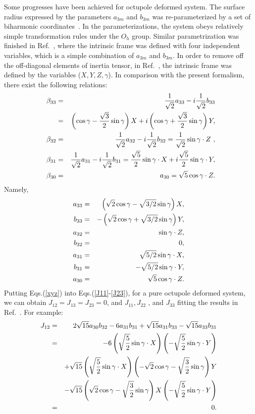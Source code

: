 \documentclass[twocolumn,prc,showpacs,preprintnumbers,superscriptaddress,floatfix]{revtex4}
\begin{document}
Some progresses have been achieved for octupole deformed system. The surface
radius expressed by the parameters $a_{3m}$ and $b_{3m}$ was
re-parameterized by a set of biharmonic coordinates~\cite%
{Rohozinski88,Rohozinski90}. In the parameterizations, the system obeys
relatively simple transformation rules under the $O_{h}$ group. Similar
parametrization was finished in Ref.~\cite{Hamamoto91}, where the intrinsic
frame was defined with four independent variables, which is a simple
combination of $a_{3m}$ and $b_{3m}$. In order to remove off the
off-diagonal elements of inertia tensor, in Ref.~\cite{Wexler99}, the
intrinsic frame was defined by the variables ($X,Y,Z,\gamma $). In
comparison with the present formalism, there exist the following relations: $%
\ $%
\begin{eqnarray}
\ \ \beta _{33} &=&\frac{1}{\sqrt{2}}a_{33}-{i}\frac{1}{\sqrt{2}}b_{33}
\notag \\
&=&\left( \cos \gamma -\frac{\sqrt{3}}{2}\sin \gamma \right) X+i\left( \cos
\gamma +\frac{\sqrt{3}}{2}\sin \gamma \right) Y,  \notag \\
\beta _{32} &=&\frac{1}{\sqrt{2}}a_{32}-{i}\frac{1}{\sqrt{2}}b_{32}=\frac{1}{%
\sqrt{2}}\sin \gamma \cdot Z\ ,  \notag \\
\beta _{31} &=&\frac{1}{\sqrt{2}}a_{31}-{i}\frac{1}{\sqrt{2}}b_{31}=\frac{%
\sqrt{5}}{2}\sin \gamma \cdot X+i\frac{\sqrt{5}}{2}\sin \gamma \cdot Y,
\notag \\
\beta _{30} &=&a_{30}=\sqrt{5}\cos \gamma \cdot Z.
\end{eqnarray}%
Namely,
\begin{eqnarray}
a_{33} &=&\left( \sqrt{2}\cos \gamma -\sqrt{3/2}\sin \gamma \right) X,
\notag \\
b_{33} &=&-\left( \sqrt{2}\cos \gamma +\sqrt{3/2}\sin \gamma \right) Y,
\notag \\
a_{32} &=&\sin \gamma \cdot Z,  \notag \\
b_{32} &=&0,  \notag \\
a_{31} &=&\sqrt{5/2}\sin \gamma \cdot X,  \notag \\
b_{31} &=&-\sqrt{5/2}\sin \gamma \cdot Y,  \notag \\
a_{30} &=&\sqrt{5}\cos \gamma \cdot Z.  \label{xyz}
\end{eqnarray}%
Putting Eqs.(\ref{xyz}) into Eqs.(\ref{J11}-\ref{J23}), for a pure octupole
deformed system, we can obtain $J_{12}=J_{13}=J_{23}=0$, and $J_{11},J_{22}$%
, and $J_{33}$ fitting the results in Ref.~\cite{Wexler99}. For example:
\begin{eqnarray}
J_{12} &=&2\sqrt{15}a_{30}b_{32}-6a_{31}b_{31}+\sqrt{15}a_{31}b_{33}-\sqrt{15%
}a_{33}b_{31}  \notag \\
&=&-6\left( \sqrt{\frac{5}{2}}\sin \gamma \cdot X\right) \left( -\sqrt{\frac{%
5}{2}}\sin \gamma \cdot Y\right)   \notag \\
&&+\sqrt{15}\left( \sqrt{\frac{5}{2}}\sin \gamma \cdot X\right) \left( -%
\sqrt{2}\cos \gamma -\sqrt{\frac{3}{2}}\sin \gamma \right) Y  \notag \\
&&-\sqrt{15}\left( \sqrt{2}\cos \gamma -\sqrt{\frac{3}{2}}\sin \gamma
\right) X\left( -\sqrt{\frac{5}{2}}\sin \gamma \cdot Y\right)   \notag \\
&=&0.
\end{eqnarray}%
\end{document}
